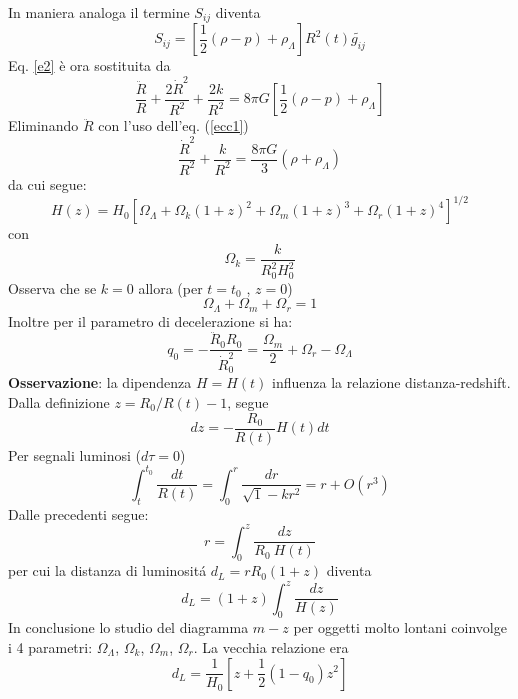 In maniera analoga il termine $S_{ij}$ diventa
\begin{equation}
  S_{ij}= \left[ \frac {1}{2}(\rho-p)  + \rho_{\Lambda} \right] R^2(t) \tilde{g_{ij}}
  \label{sijcc}
\end{equation}
Eq. \eqref{e2}  è ora sostituita da
\begin{equation}
  \frac {\ddot{R}}{R}+\frac{2\dot{R}^2}{R^2}+\frac{2k}{R^2}=
  8 \pi G \left[ \frac{1}{2}(\rho-p) +\rho_{\Lambda} \right]
  \label{ecc1}
\end{equation}
Eliminando $\ddot R$ con l'uso dell'eq. (\ref{ecc1})
\begin{equation}
  \frac  {\dot{R}^2} {R^2} +\frac {k}{R^2} = \frac {8 \pi G}{3} (\rho+\rho_{\Lambda})
\end{equation}
da cui segue:
\begin{equation}
 H(z)=H_0 \left[\Omega_{\Lambda}+\Omega_{k}(1+z)^2+\Omega_m (1+z)^3+\Omega_r (1+z)^4\right]^{1/2}
 \label{hzcc}
\end{equation}
con
\begin{equation}
  \Omega_k = \frac {k}{R_0^2 H_0^2}
\end{equation}
Osserva che se $k=0$ allora (per $t=t_0$ , $z=0$)
\begin{equation}
  \Omega_{\Lambda} + \Omega_m  + \Omega_r = 1
\end{equation}
Inoltre per il parametro di decelerazione si ha:
\begin{equation}
  q_0= -\frac {\ddot R_0 R_0}{\dot R_0^2} = \frac{\Omega_m}{2} + \Omega_r -\Omega_{\Lambda}
  \label{q0cc}
\end{equation}
{\bf Osservazione}: la dipendenza $H=H(t)$ influenza la relazione
distanza-redshift.  Dalla definizione $z=R_0/R(t) -1$, segue
\begin{equation}
  dz = -\frac {R_0}{R(t)} H(t) dt
\end{equation}
Per segnali luminosi ($d \tau=0$)
\begin{equation}
  \int_t^{t_0} \frac {dt}{R(t)}= \int_0^{r} \frac {dr}{\sqrt1-kr^2} = r + O(r^3)
\end{equation}
Dalle precedenti segue:
\begin{equation}
  r= \int_0^z \frac{dz}{R_0 ~ H(t)}
\end{equation}
per cui la distanza di luminosit\'a $d_L= r R_0 (1+z)$ diventa
\begin{equation}
  d_L = (1+z) \int_0^z \frac{dz}{H(z)}
\end{equation}
In conclusione lo studio del diagramma $m-z$ per oggetti molto lontani coinvolge
i 4 parametri: $\Omega_{\Lambda}$, $\Omega_{k}$, $\Omega_{m}$, $\Omega_{r}$.  La
vecchia relazione era
\begin{equation}
  d_L = \frac {1}{H_0} \left[ z+ \frac{1}{2}(1-q_0)z^2\right]
\end{equation}

